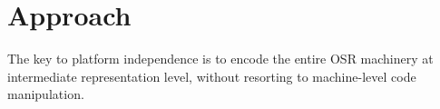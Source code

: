 \section{Approach}
\label{se:approach}

The key to platform independence is to encode the entire OSR machinery at intermediate representation level, without resorting to machine-level code manipulation.


  
  
  
  
  